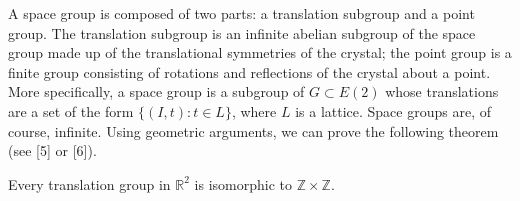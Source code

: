  
A space group is composed of two parts: a {\bfi translation
subgroup\/} and a {\bfi point
group}.  The translation subgroup is an infinite
abelian subgroup of the space group made up of the translational
symmetries of the crystal; the point group is a finite group 
consisting  of rotations and reflections of the crystal about a point.
More specifically, a space group is a subgroup of $G \subset E(2)$
whose translations are a set of the form $\{ (I, t) : t \in L \}$,
where $L$ is a lattice. Space groups are, of course, infinite. Using
geometric arguments, we can prove the following theorem (see [5] or [6]).
 
 
 
 
\begin{theorem}
Every translation group in ${\mathbb R}^2$ is isomorphic to ${\mathbb Z}
\times {\mathbb Z}$.
\end{theorem}
 
